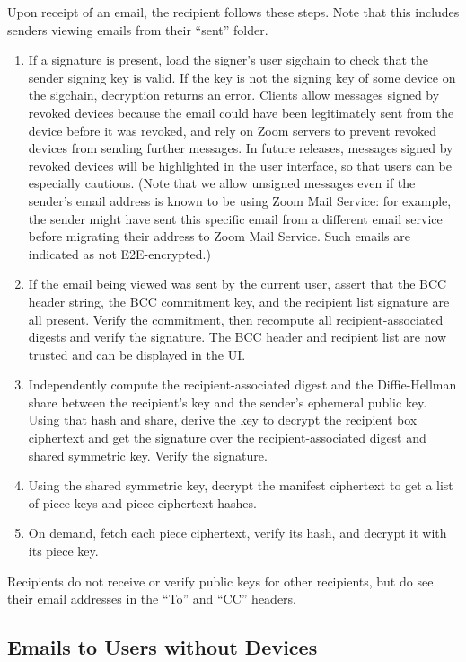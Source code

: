 Upon receipt of an email, the recipient follows these steps. Note that this includes senders viewing
emails from their ``sent'' folder.

\begin{enumerate}
\item If a signature is present, load the signer's user sigchain to check that the sender signing
key is valid. If the key is not the signing key of some device on the sigchain, decryption returns
an error. Clients allow messages signed by revoked devices because the email could have been
legitimately sent from the device before it was revoked, and rely on Zoom servers to prevent revoked
devices from sending further messages. In future releases, messages signed by revoked devices will
be highlighted in the user interface, so that users can be especially cautious. (Note that we allow
unsigned messages even if the sender's email address is known to be using Zoom Mail Service: for
example, the sender might have sent this specific email from a different email service before
migrating their address to Zoom Mail Service. Such emails are indicated as not E2E-encrypted.)
\item If the email being viewed was sent by the current user, assert that the BCC header string, the
BCC commitment key, and the recipient list signature are all present. Verify the commitment, then
recompute all recipient-associated digests and verify the signature. The BCC header and recipient
list are now trusted and can be displayed in the UI.
\item Independently compute the recipient-associated digest and the Diffie-Hellman share between the
recipient's key and the sender's ephemeral public key. Using that hash and share, derive the key to
decrypt the recipient box ciphertext and get the signature over the recipient-associated digest and
shared symmetric key. Verify the signature.
\item Using the shared symmetric key, decrypt the manifest ciphertext to get a list of piece keys
and piece ciphertext hashes.
\item On demand, fetch each piece ciphertext, verify its hash, and decrypt it with its piece key.
\end{enumerate}

Recipients do not receive or verify public keys for other recipients, but do see their email
addresses in the ``To'' and ``CC'' headers.

\subsection{Emails to Users without Devices}

